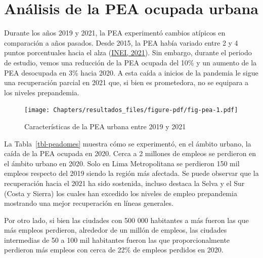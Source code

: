 \documentclass[
  letterpaper,
  12pt,
  oneside,
  spanish,
  doublespacing,
  headsepline,
  parskip]{MastersDoctoralThesis}
\begin{document}
\hypertarget{anuxe1lisis-de-la-pea-ocupada-urbana}{%
\section{Análisis de la PEA ocupada
urbana}\label{anuxe1lisis-de-la-pea-ocupada-urbana}}

Durante los años 2019 y 2021, la PEA experimentó cambios atípicos en
comparación a años pasados. Desde 2015, la PEA había variado entre 2 y 4
puntos porcentuales hacia el alza
(\protect\hyperlink{ref-inei2021}{INEI, 2021}). Sin embargo, durante el
periodo de estudio, vemos una reducción de la PEA ocupada del 10\% y un
aumento de la PEA desocupada en 3\% hacia 2020. A esta caída a inicios
de la pandemia le sigue una recuperación parcial en 2021 que, si bien es
prometedora, no se equipara a los niveles prepandemia.

\begin{figure}

\caption{\label{fig-pea}Características de la PEA urbana entre 2019 y
2021}

{\centering \texttt{[image: Chapters/resultados\_files/figure-pdf/fig-pea-1.pdf]}

}

\end{figure}

La Tabla~\ref{tbl-peadomes} muestra cómo se experimentó, en el ámbito
urbano, la caída de la PEA ocupada en 2020. Cerca a 2 millones de
empleos se perdieron en el ámbito urbano en 2020. Solo en Lima
Metropolitana se perdieron 150 mil empleos respecto del 2019 siendo la
región más afectada. Se puede observar que la recuperación hacia el 2021
ha sido sostenida, incluso destaca la Selva y el Sur (Costa y Sierra)
los cuales han excedido los niveles de empleo prepandemia mostrando una
mejor recuperación en líneas generales.

Por otro lado, si bien las ciudades con 500 000 habitantes a más fueron
las que más empleos perdieron, alrededor de un millón de empleos, las
ciudades intermedias de 50 a 100 mil habitantes fueron las que
proporcionalmente perdieron más empleos con cerca de 22\% de empleos
perdidos en 2020.
\end{document}
